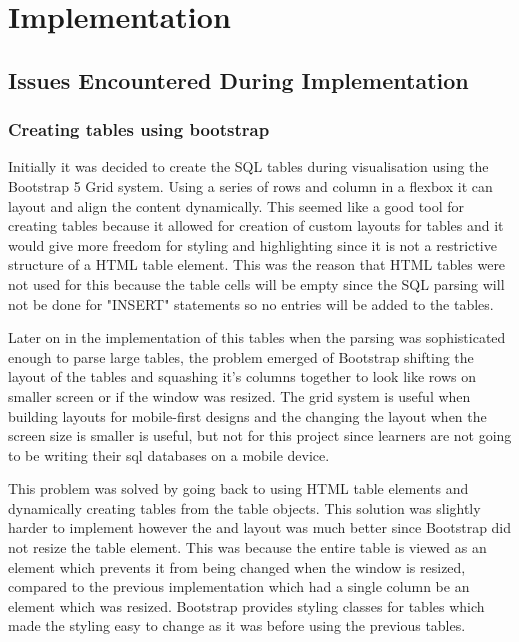 \chapter{Implementation}

\section{Issues Encountered During Implementation}

\subsection{Creating tables using bootstrap}

Initially it was decided to create the SQL tables during visualisation using the Bootstrap 5 Grid system. Using a series of rows and column in a flexbox it can layout and align the content dynamically. This seemed like a good tool for creating tables because it allowed for creation of custom layouts for tables and it would give more freedom for styling and highlighting since it is not a restrictive structure of a HTML table element. This was the reason that HTML tables were not used for this because the table cells will be empty since the SQL parsing will not be done for "INSERT" statements so no entries will be added to the tables.

Later on in the implementation of this tables when the parsing was sophisticated enough to parse large tables, the problem emerged of Bootstrap shifting the layout of the tables and squashing it's columns together to look like rows on smaller screen or if the window was resized. The grid system is useful when building layouts for mobile-first designs and the changing the layout when the screen size is smaller is useful, but not for this project since learners are not going to be writing their sql databases on a mobile device. 


This problem was solved by going back to using HTML table elements and dynamically creating tables from the table objects. This solution was slightly harder to implement however the and layout was much better since Bootstrap did not resize the table element. This was because the entire table is viewed as an element which prevents it from being changed when the window is resized, compared to the previous implementation which had a single column be an element which was resized. Bootstrap provides styling classes for tables which made the styling easy to change as it was before using the previous tables.

